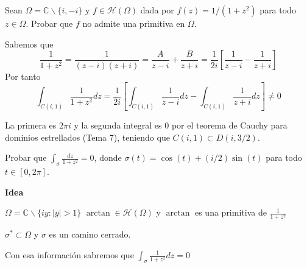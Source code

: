 \begin{ejer}
	Sean $\Omega = \mathbb{C}\backslash \{i,-i\}$ y $f\in\mathcal{H}(\Omega)$ dada por $f(z)=1/(1+z^2)$ para todo $z\in\Omega$. Probar que $f$ no admite una primitiva en $\Omega$.
\end{ejer}

\begin{sol}
Sabemos que
$$\frac{1}{1+z^2} = \frac{1}{(z-i)(z+i)} = \frac{A}{z-i} + \frac{B}{z+i} = \frac{1}{2i} \left[ \frac{1}{z-i} - \frac{1}{z+i} \right]$$
Por tanto
$$\int_{C(i,1)} \frac{1}{1+z^2} dz = \frac{1}{2i} \left[ \int_{C(i,1)}\frac{1}{z-i}dz - \int_{C(i,1)} \frac{1}{z+i}dz \right] \not = 0$$

La primera es $2\pi i$ y la segunda integral es $0$ por el teorema de Cauchy para dominios estrellados (Tema 7), teniendo que $C(i,1) \subset D(i,3/2)$.
\end{sol}


\begin{ejer}
	Probar que $\int_{\sigma} \frac{dz}{1+z^2} = 0$, donde $\sigma(t) = \cos(t)+(i/2)\sin(t)$ para todo $t\in[0,2\pi]$.
\end{ejer}
\textbf{Idea}

$\Omega = \mathbb{C}\backslash \{ iy : |y|>1 \}$
$\arctan \in \mathcal{H}(\Omega)$ y $\arctan$ es una primitiva de $\frac{1}{1+z^2}$

$\sigma ^{\ast} \subset \Omega$ y $\sigma$ es un camino cerrado.

Con esa información sabremos que 
$\int_{\sigma} \frac{1}{1+z^2} dz = 0$

